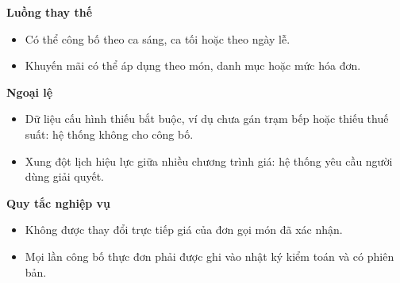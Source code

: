 \documentclass[11pt,a4paper]{article}
\begin{document}
\begin{usecasebox}[title={UC-ADM-01 --- Quản lý menu và giá bán}]
    \textbf{Luồng thay thế}
    \begin{itemize}[leftmargin=1.8em]
  \item Có thể công bố theo ca sáng, ca tối hoặc theo ngày lễ.
  \item Khuyến mãi có thể áp dụng theo món, danh mục hoặc mức hóa đơn.
\end{itemize}

    \textbf{Ngoại lệ}
    \begin{itemize}[leftmargin=1.8em]
  \item Dữ liệu cấu hình thiếu bắt buộc, ví dụ chưa gán trạm bếp hoặc thiếu thuế suất: hệ thống không cho công bố.
  \item Xung đột lịch hiệu lực giữa nhiều chương trình giá: hệ thống yêu cầu người dùng giải quyết.
\end{itemize}

    \textbf{Quy tắc nghiệp vụ}
    \begin{itemize}[leftmargin=1.8em]
  \item Không được thay đổi trực tiếp giá của đơn gọi món đã xác nhận.
  \item Mọi lần công bố thực đơn phải được ghi vào nhật ký kiểm toán và có phiên bản.
\end{itemize}
    \end{usecasebox}
\end{document}
